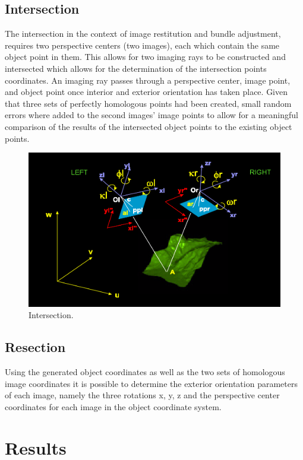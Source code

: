 \documentclass{article}
\begin{document}
\subsection{Intersection}
The intersection in the context of image restitution and bundle adjustment, requires two perspective centers (two images),
each which contain the same object point in them.
This allows for two imaging rays to be constructed and intersected which allows for the determination of the intersection points coordinates.
An imaging ray passes through a perspective center, image point, and object point once interior and exterior orientation has taken place.
Given that three sets of perfectly homologous points had been created, small random errors where added to the second images' image points
to allow for a meaningful comparison of the results of the intersected object points to the existing object points.

\begin{figure}[h!]
\centering
\caption{Intersection.}
\includegraphics[scale=0.2]{intersection}
\end{figure}


\subsection{Resection}
Using the generated object coordinates as well as the two sets of homologous image coordinates
it is possible to determine the exterior orientation parameters of each image, namely the three rotations
x, y, z and the perspective center coordinates for each image in the object coordinate system. 

\section{Results}
\end{document}
